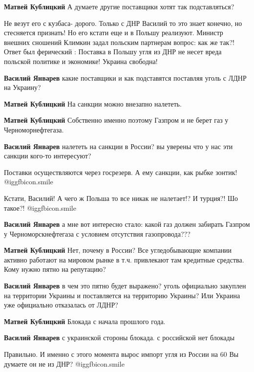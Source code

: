 \begin{itemize}
\begin{itemize}
\textbf{Матвей Кублицкий} А думаете другие поставщики хотят так подставляться?

\obeycr
Не везут его с кузбаса- дорого.
Только с ДНР
Василий то это знает конечно, но стесняется признать!
Но его кстати еще и в Польшу реализуют.
Министр внешних сношений Климкин задал польским партнерам вопрос: как же так?!
Ответ был ферический :
Поставка в Польшу угля из ДНР не несет вреда польской политике и экономике!
Украина свободна!
\restorecr

\textbf{Василий Январев} какие поставщики и как подставятся поставляя уголь с ЛДНР на Украину?

\textbf{Матвей Кублицкий} На санкции можно внезапно налететь.

\textbf{Матвей Кублицкий} Собственно именно поэтому Газпром и не берет газ у Черноморнефтегаза.

\textbf{Василий Январев} налететь на санкции в России? вы уверены что у нас эти санкции кого-то интересуют?


Поставки осуществляются через госрезерв.
А ему санкции, как рыбке зонтик!
 @igg{fbicon.smile} 

Кстати, Василий!
А чего ж Польша то все никак не налетает!?
И турция?!
Шо такое?!
 @igg{fbicon.smile} 

\textbf{Василий Январев} а мне вот интересно стало: какой газ должен забирать Газпром у Черноморскнефтегаза с условием отсутствия газопровода???

\textbf{Матвей Кублицкий} Нет, почему в России? Все угледобывающие компании активно работают на мировом рынке в т.ч. привлекают там кредитные средства. Кому нужно пятно на репутацию?

\textbf{Василий Январев} в чем это пятно будет выражено? уголь официально закуплен на территории Украины и поставляется на территорию Украины? Или Украина уже официально отказалась от ЛДНР?

\textbf{Матвей Кублицкий} Блокада с начала прошлого года.

\textbf{Василий Январев} с украинской стороны блокада. с российской нет блокады

Правильно.
И именно с этого момента вырос импорт угля из России на 60 %
Вы думаете он не из ДНР?
 @igg{fbicon.smile} 


\end{itemize}
\end{itemize}
